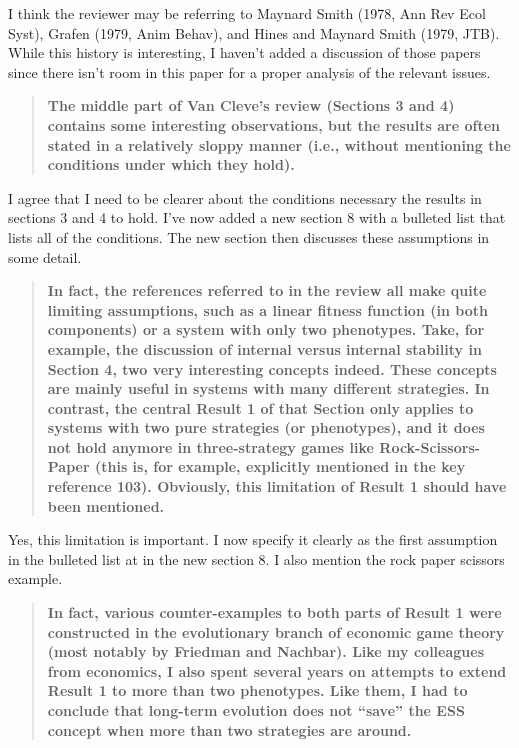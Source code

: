 \documentclass[10pt,parskip=full,foldmarks=off,addrfield=off,backaddress=false,refline=dateleft,letterpaper]{scrlttr2}
\newenvironment{reviewerquote}{\begin{quote}\color{DarkBlue}\bfseries}{\end{quote}}
\begin{document}
\begin{letter}
I think the reviewer may be referring to Maynard Smith (1978, Ann Rev Ecol Syst), Grafen (1979, Anim Behav), and Hines and Maynard Smith (1979, JTB). While this history is interesting, I haven't added a discussion of those papers since there isn't room in this paper for a proper analysis of the relevant issues.

\begin{reviewerquote}
  The middle part of Van Cleve’s review (Sections 3 and 4) contains some interesting observations, but the results are often stated in a relatively sloppy manner (i.e., without mentioning the conditions under which they hold).
\end{reviewerquote}

I agree that I need to be clearer about the conditions necessary the results in sections 3 and 4 to hold. I've now added a new section 8 with a bulleted list that lists all of the conditions. The new section then discusses these assumptions in some detail.

\begin{reviewerquote}
  In fact, the references referred to in the review all make quite limiting assumptions, such as a linear fitness function (in both components) or a system with only two phenotypes. Take, for example, the discussion of internal versus internal stability in Section 4, two very interesting concepts indeed. These concepts are mainly useful in systems with many different strategies. In contrast, the central Result 1 of that Section only applies to systems with two pure strategies (or phenotypes), and it does not hold anymore in three-strategy games like Rock-Scissors-Paper (this is, for example, explicitly mentioned in the key reference 103). Obviously, this limitation of Result 1 should have been mentioned.
\end{reviewerquote}

Yes, this limitation is important. I now specify it clearly as the first assumption in the bulleted list at in the new section 8. I also mention the rock paper scissors example.

\begin{reviewerquote}
  In fact, various counter-examples to both parts of Result 1 were constructed in the evolutionary branch of economic game theory (most notably by Friedman and Nachbar). Like my colleagues from economics, I also spent several years on attempts to extend Result 1 to more than two phenotypes. Like them, I had to conclude that long-term evolution does not “save” the ESS concept when more than two strategies are around.
\end{reviewerquote}


\end{letter}
\end{document}
